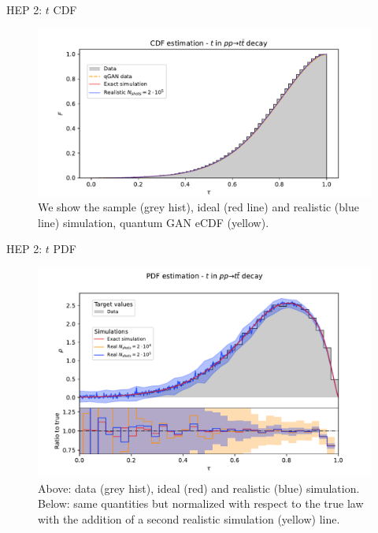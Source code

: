 \documentclass[8pt, xcolor={svgnames}, hyperref={colorlinks, linkcolor=black, citecolor=amethyst, urlcolor=amethyst}]{beamer}
\begin{document}
\begin{frame}[fragile]{HEP 2: $t$ CDF}
\begin{figure}
  \centering
  \includegraphics[width=1\linewidth]{figures/CDF_t_20_20_200000.pdf}
  \caption{We show the sample (grey hist), ideal (red line) and realistic 
  (blue line) simulation, quantum GAN eCDF (yellow).}
\end{figure}
\end{frame}

\begin{frame}[fragile]{HEP 2: $t$ PDF}
\begin{figure}
  \centering
  \includegraphics[width=1\linewidth]{figures/PDF_t_20_20_200000.pdf}
  \caption{Above: data (grey hist), ideal (red) and realistic (blue) simulation. 
  Below: same quantities but normalized
  with respect to the true law with the addition of a second realistic simulation
  (yellow) line.}
\end{figure}
\end{frame}
\end{document}
